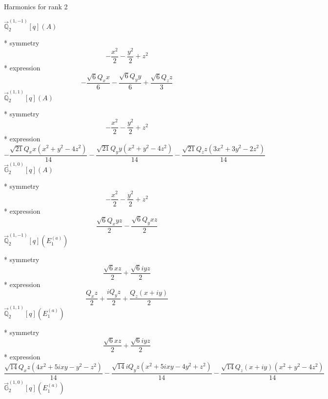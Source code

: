 \documentclass[fleqn,8pt]{jsarticle}
\begin{document}
\noindent * Harmonics for rank 2

\noindent\quad $\vec{\mathbb{Q}}_{2}^{(1,-1)}[q](A)$

\noindent\quad ** symmetry
\begin{dmath*}
- \frac{x^{2}}{2} - \frac{y^{2}}{2} + z^{2}
\end{dmath*}
\noindent\quad ** expression
\begin{dmath*}
- \frac{\sqrt{6} Q_{x} x}{6} - \frac{\sqrt{6} Q_{y} y}{6} + \frac{\sqrt{6} Q_{z} z}{3}
\end{dmath*}
\noindent\quad $\vec{\mathbb{Q}}_{2}^{(1,1)}[q](A)$

\noindent\quad ** symmetry
\begin{dmath*}
- \frac{x^{2}}{2} - \frac{y^{2}}{2} + z^{2}
\end{dmath*}
\noindent\quad ** expression
\begin{dmath*}
- \frac{\sqrt{21} Q_{x} x \left(x^{2} + y^{2} - 4 z^{2}\right)}{14} - \frac{\sqrt{21} Q_{y} y \left(x^{2} + y^{2} - 4 z^{2}\right)}{14} - \frac{\sqrt{21} Q_{z} z \left(3 x^{2} + 3 y^{2} - 2 z^{2}\right)}{14}
\end{dmath*}
\noindent\quad $\vec{\mathbb{G}}_{2}^{(1,0)}[q](A)$

\noindent\quad ** symmetry
\begin{dmath*}
- \frac{x^{2}}{2} - \frac{y^{2}}{2} + z^{2}
\end{dmath*}
\noindent\quad ** expression
\begin{dmath*}
\frac{\sqrt{6} Q_{x} y z}{2} - \frac{\sqrt{6} Q_{y} x z}{2}
\end{dmath*}
\noindent\quad $\vec{\mathbb{Q}}_{2}^{(1,-1)}[q](E_{1}^{(a)})$

\noindent\quad ** symmetry
\begin{dmath*}
\frac{\sqrt{6} x z}{2} + \frac{\sqrt{6} i y z}{2}
\end{dmath*}
\noindent\quad ** expression
\begin{dmath*}
\frac{Q_{x} z}{2} + \frac{i Q_{y} z}{2} + \frac{Q_{z} \left(x + i y\right)}{2}
\end{dmath*}
\noindent\quad $\vec{\mathbb{Q}}_{2}^{(1,1)}[q](E_{1}^{(a)})$

\noindent\quad ** symmetry
\begin{dmath*}
\frac{\sqrt{6} x z}{2} + \frac{\sqrt{6} i y z}{2}
\end{dmath*}
\noindent\quad ** expression
\begin{dmath*}
\frac{\sqrt{14} Q_{x} z \left(4 x^{2} + 5 i x y - y^{2} - z^{2}\right)}{14} - \frac{\sqrt{14} i Q_{y} z \left(x^{2} + 5 i x y - 4 y^{2} + z^{2}\right)}{14} - \frac{\sqrt{14} Q_{z} \left(x + i y\right) \left(x^{2} + y^{2} - 4 z^{2}\right)}{14}
\end{dmath*}
\noindent\quad $\vec{\mathbb{G}}_{2}^{(1,0)}[q](E_{1}^{(a)})$
\end{document}
